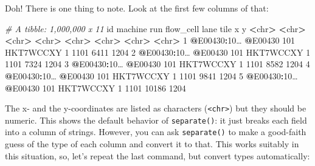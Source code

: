 \documentclass[]{krantz}
\makeatletter
\newenvironment{Shaded}{\begin{snugshade}}{\end{snugshade}}
\newcommand{\CommentTok}[1]{\textcolor[rgb]{0.37,0.37,0.37}{\textit{#1}}}
\newcommand{\DecValTok}[1]{\textcolor[rgb]{0.06,0.06,0.06}{#1}}
\newcommand{\ErrorTok}[1]{\textcolor[rgb]{0.14,0.14,0.14}{\textbf{#1}}}
\newcommand{\NormalTok}[1]{#1}
\newcommand{\OperatorTok}[1]{\textcolor[rgb]{0.43,0.43,0.43}{\textbf{#1}}}
\newcommand{\StringTok}[1]{\textcolor[rgb]{0.5,0.5,0.5}{#1}}
\newenvironment{kframe}{%
\medskip{}
\setlength{\fboxsep}{.8em}
 \def\at@end@of@kframe{}%
 \ifinner\ifhmode%
  \def\at@end@of@kframe{\end{minipage}}%
  \begin{minipage}{\columnwidth}%
 \fi\fi%
 \def\FrameCommand##1{\hskip\@totalleftmargin \hskip-\fboxsep
 \colorbox{shadecolor}{##1}\hskip-\fboxsep
     \hskip-\linewidth \hskip-\@totalleftmargin \hskip\columnwidth}%
 \MakeFramed {\advance\hsize-\width
   \@totalleftmargin\z@ \linewidth\hsize
   \@setminipage}}%
 {\par\unskip\endMakeFramed%
 \at@end@of@kframe}
\renewenvironment{Shaded}{\begin{kframe}}{\end{kframe}}
\makeatother
\begin{document}
Doh! There is one thing to note. Look at the first few columns of that:

\begin{Shaded}
\begin{Highlighting}[]
\CommentTok{# A tibble: 1,000,000 x 11}
\NormalTok{   id          machine run   flow_cell lane  tile  x     y   }
   \OperatorTok{<}\NormalTok{chr}\OperatorTok{>}\StringTok{       }\ErrorTok{<}\NormalTok{chr}\OperatorTok{>}\StringTok{   }\ErrorTok{<}\NormalTok{chr}\OperatorTok{>}\StringTok{ }\ErrorTok{<}\NormalTok{chr}\OperatorTok{>}\StringTok{     }\ErrorTok{<}\NormalTok{chr}\OperatorTok{>}\StringTok{ }\ErrorTok{<}\NormalTok{chr}\OperatorTok{>}\StringTok{ }\ErrorTok{<}\NormalTok{chr}\OperatorTok{>}\StringTok{ }\ErrorTok{<}\NormalTok{chr}\OperatorTok{>}\StringTok{      }
\StringTok{ }\DecValTok{1} \OperatorTok{@}\NormalTok{E00430}\OperatorTok{:}\NormalTok{10… }\OperatorTok{@}\NormalTok{E00430 }\DecValTok{101}\NormalTok{   HKT7WCCXY }\DecValTok{1}     \DecValTok{1101}  \DecValTok{6411}  \DecValTok{1204}
 \DecValTok{2} \OperatorTok{@}\NormalTok{E00430}\OperatorTok{:}\NormalTok{10… }\OperatorTok{@}\NormalTok{E00430 }\DecValTok{101}\NormalTok{   HKT7WCCXY }\DecValTok{1}     \DecValTok{1101}  \DecValTok{7324}  \DecValTok{1204}
 \DecValTok{3} \OperatorTok{@}\NormalTok{E00430}\OperatorTok{:}\NormalTok{10… }\OperatorTok{@}\NormalTok{E00430 }\DecValTok{101}\NormalTok{   HKT7WCCXY }\DecValTok{1}     \DecValTok{1101}  \DecValTok{8582}  \DecValTok{1204}
 \DecValTok{4} \OperatorTok{@}\NormalTok{E00430}\OperatorTok{:}\NormalTok{10… }\OperatorTok{@}\NormalTok{E00430 }\DecValTok{101}\NormalTok{   HKT7WCCXY }\DecValTok{1}     \DecValTok{1101}  \DecValTok{9841}  \DecValTok{1204}
 \DecValTok{5} \OperatorTok{@}\NormalTok{E00430}\OperatorTok{:}\NormalTok{10… }\OperatorTok{@}\NormalTok{E00430 }\DecValTok{101}\NormalTok{   HKT7WCCXY }\DecValTok{1}     \DecValTok{1101}  \DecValTok{10186} \DecValTok{1204} 
\end{Highlighting}
\end{Shaded}

The x- and the y-coordinates are listed as characters (\texttt{\textless{}chr\textgreater{}}) but they should
be numeric. This shows the default behavior of \texttt{separate()}: it just breaks each
field into a column of strings. However, you can ask \texttt{separate()} to make a good-faith
guess of the type of each column and convert it to that. This works suitably in this
situation, so, let's repeat the last command, but convert types automatically:
\end{document}
